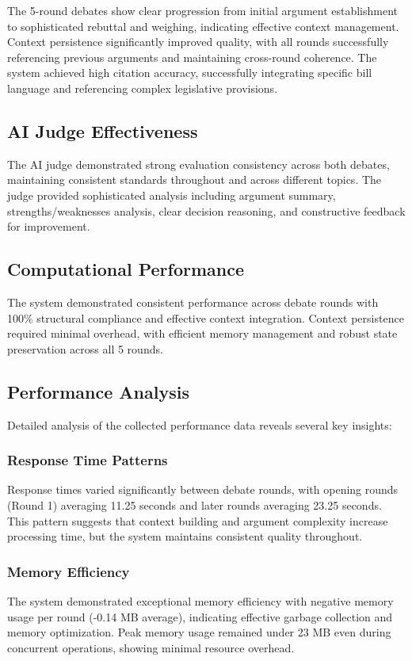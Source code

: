 \documentclass{article}
\begin{document}
The 5-round debates show clear progression from initial argument establishment to sophisticated rebuttal and weighing, indicating effective context management. Context persistence significantly improved quality, with all rounds successfully referencing previous arguments and maintaining cross-round coherence. The system achieved high citation accuracy, successfully integrating specific bill language and referencing complex legislative provisions.

\subsection{AI Judge Effectiveness}

The AI judge demonstrated strong evaluation consistency across both debates, maintaining consistent standards throughout and across different topics. The judge provided sophisticated analysis including argument summary, strengths/weaknesses analysis, clear decision reasoning, and constructive feedback for improvement.

\subsection{Computational Performance}

The system demonstrated consistent performance across debate rounds with 100\% structural compliance and effective context integration. Context persistence required minimal overhead, with efficient memory management and robust state preservation across all 5 rounds.

\subsection{Performance Analysis}

Detailed analysis of the collected performance data reveals several key insights:

\subsubsection{Response Time Patterns}
Response times varied significantly between debate rounds, with opening rounds (Round 1) averaging 11.25 seconds and later rounds averaging 23.25 seconds. This pattern suggests that context building and argument complexity increase processing time, but the system maintains consistent quality throughout.

\subsubsection{Memory Efficiency}
The system demonstrated exceptional memory efficiency with negative memory usage per round (-0.14 MB average), indicating effective garbage collection and memory optimization. Peak memory usage remained under 23 MB even during concurrent operations, showing minimal resource overhead.
\end{document}
